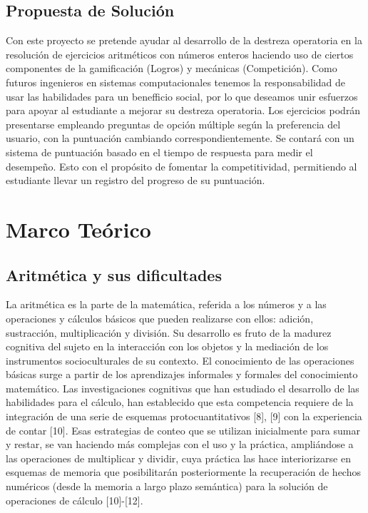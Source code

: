 \documentclass{article}
\begin{document}
\subsection{Propuesta de Solución}
Con este proyecto se pretende ayudar al desarrollo de la destreza operatoria en la resolución de ejercicios aritméticos con números enteros haciendo uso de ciertos componentes de la gamificación (Logros) y mecánicas (Competición). Como futuros ingenieros en sistemas computacionales tenemos la responsabilidad de usar las habilidades para un benefficio social, por lo que deseamos unir esfuerzos para apoyar al estudiante a mejorar su destreza operatoria.
Los ejercicios podrán presentarse empleando preguntas de opción múltiple según la preferencia del usuario,
con la puntuación cambiando correspondientemente. Se contará con un sistema de puntuación basado en el tiempo de
respuesta para medir el desempeño. Esto con el propósito de fomentar la competitividad, permitiendo al estudiante llevar
un registro del progreso de su puntuación.
\section{Marco Teórico}
\subsection{Aritmética y sus dificultades}
La aritmética es la parte de la matemática, referida a los números y a las operaciones y cálculos básicos que pueden realizarse con ellos: adición, sustracción, multiplicación y división. Su desarrollo es fruto de la madurez cognitiva del sujeto en la interacción con los objetos y la mediación de los instrumentos socioculturales de su contexto. El conocimiento de las operaciones básicas surge a partir de los aprendizajes informales y formales del conocimiento matemático.
Las investigaciones cognitivas que han estudiado el desarrollo de las habilidades para el cálculo, han establecido que esta competencia requiere de la integración de una serie de esquemas protocuantitativos [8], [9] con la experiencia de contar [10].
Esas estrategias de conteo que se utilizan inicialmente para sumar y restar, se van haciendo más complejas con el uso y la práctica, ampliándose a las operaciones de multiplicar y dividir, cuya práctica las hace interiorizarse en esquemas de memoria que posibilitarán posteriormente la recuperación de hechos numéricos (desde la memoria a largo plazo semántica) para la solución de operaciones de cálculo [10]-[12].
\end{document}

